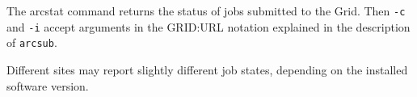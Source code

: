 The arcstat command returns the status of jobs submitted to the Grid. Then \texttt{-c} and \texttt{-i} accept arguments in the GRID:URL notation explained in the description of \texttt{arcsub}.

Different sites may report slightly different job states, depending on
the installed software version.%



